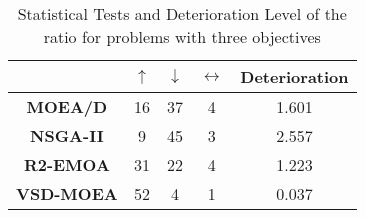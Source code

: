 \begin{table}[t]
\caption{Statistical Tests and Deterioration Level of the \HV{} ratio for problems with three objectives}
\label{tab:Tests_HV_3obj}
\centering
\begin{scriptsize}
\begin{tabular}{c c|c|c|c}
\cline{2-5}
                                        & \textbf{$\uparrow$} & \textbf{$\downarrow$} & \textbf{$\leftrightarrow$} & \textbf{Deterioration} \\ \hline
\multicolumn{1}{c|}{\textbf{MOEA/D}}   & 16                  & 37                    & 4                          & 1.601         \\ \hline
\multicolumn{1}{c|}{\textbf{NSGA-II}}  & 9                   & 45                    & 3                          & 2.557         \\ \hline
\multicolumn{1}{c|}{\textbf{R2-EMOA}}  & 31                  & 22                    & 4                          & 1.223         \\ \hline
\multicolumn{1}{c|}{\textbf{VSD-MOEA}} & 52                  & 4                     & 1                          & 0.037         \\ \hline
\end{tabular}%
\end{scriptsize}
\end{table}

%
